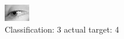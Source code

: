 \begin{figure}[h!]
\begin{center}
\includegraphics[width=0.60\columnwidth]{figures/ID3061_class_3_target_4.png}
\end{center}
\caption{ Classification: 3 actual target: 4}
\label{fig:ID3061_class_3_target_4}
\end{figure}
